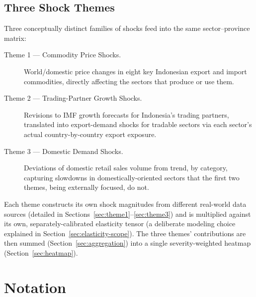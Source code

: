 \documentclass[11pt]{article}
\begin{document}
\subsection{Three Shock Themes}

Three conceptually distinct families of shocks feed into the same
sector--province matrix:

\begin{description}
  \item[Theme 1 --- Commodity Price Shocks.] World/domestic price changes in
  eight key Indonesian export and import commodities, directly affecting
  the sectors that produce or use them.
  \item[Theme 2 --- Trading-Partner Growth Shocks.] Revisions to IMF growth
  forecasts for Indonesia's trading partners, translated into
  export-demand shocks for tradable sectors via each sector's actual
  country-by-country export exposure.
  \item[Theme 3 --- Domestic Demand Shocks.] Deviations of domestic retail
  sales volume from trend, by category, capturing slowdowns in
  domestically-oriented sectors that the first two themes, being
  externally focused, do not.
\end{description}

Each theme constructs its own shock magnitudes from different real-world
data sources (detailed in Sections~\ref{sec:theme1}--\ref{sec:theme3}) and is
multiplied against its own, separately-calibrated elasticity tensor (a
deliberate modeling choice explained in Section~\ref{sec:elasticity-scope}).
The three themes' contributions are then summed (Section~\ref{sec:aggregation})
into a single severity-weighted heatmap (Section~\ref{sec:heatmap}).

\section{Notation}
\end{document}
